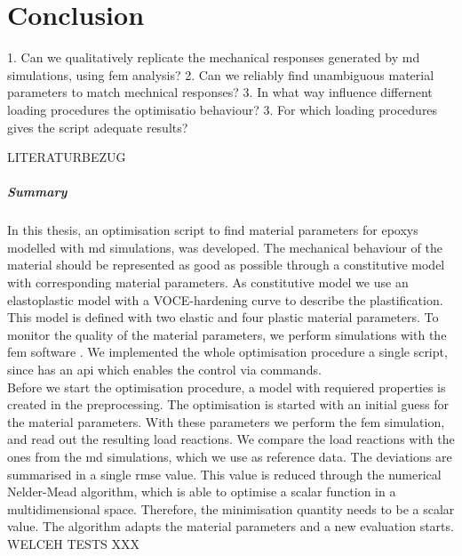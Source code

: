 \chapter{Conclusion}
1. Can we qualitatively replicate the mechanical responses generated by \acrshort{md} simulations, using \acrshort{fem} analysis? 
2. Can we reliably find unambiguous material parameters to match mechnical responses?
3. In what way influence differnent loading procedures the optimisatio behaviour?
3. For which loading procedures gives the script adequate results? 


LITERATURBEZUG

\paragraph{Summary}
In this thesis, an optimisation script to find material parameters for epoxys modelled with \acrshort{md} simulations, was developed. The mechanical behaviour of the material should be represented as good as possible through a constitutive model with corresponding material parameters. As constitutive model we use an elastoplastic model with a VOCE-hardening curve to describe the plastification. This model is defined with two elastic and four plastic material parameters. To monitor the quality of the material parameters, we perform simulations with the \acrshort{fem} software . We implemented the whole optimisation procedure a single  script, since  has an \acrlong{api} which enables the control via  commands. \\
Before we start the optimisation procedure, a model with requiered properties is created in the preprocessing. The optimisation is started with an initial guess for the material parameters. With these parameters we perform the \acrshort{fem} simulation, and read out the resulting load reactions. We compare the load reactions with the ones from the \acrshort{md} simulations, which we use as reference data. The deviations are summarised in a single \acrshort{rmse} value. This value is reduced through the numerical Nelder-Mead algorithm, which is able to optimise a scalar function in a multidimensional space. Therefore, the minimisation quantity needs to be a scalar value. The algorithm adapts the material parameters and a new evaluation starts. 
WELCEH TESTS XXX


